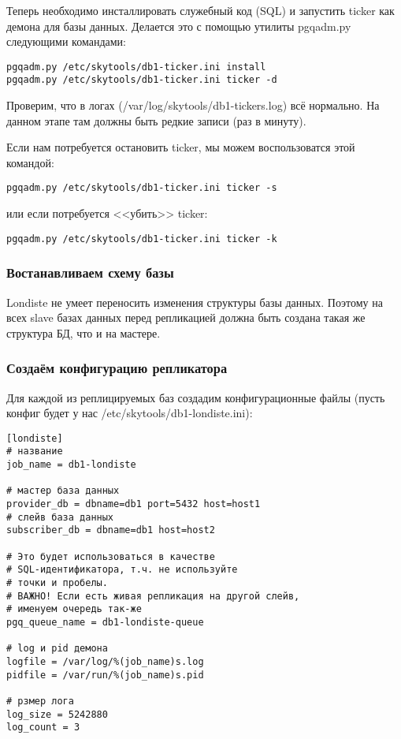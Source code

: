 Теперь необходимо инсталлировать служебный код (SQL) и запустить ticker как демона для базы данных. 
Делается это с помощью утилиты pgqadm.py следующими командами:
\begin{verbatim}
pgqadm.py /etc/skytools/db1-ticker.ini install
pgqadm.py /etc/skytools/db1-ticker.ini ticker -d
\end{verbatim}

Проверим, что в логах (/var/log/skytools/db1-tickers.log) всё нормально. На данном этапе там должны быть редкие записи (раз в минуту).

Если нам потребуется остановить ticker, мы можем воспользоватся этой командой:
\begin{verbatim}
pgqadm.py /etc/skytools/db1-ticker.ini ticker -s
\end{verbatim}
или если потребуется <<убить>> ticker:
\begin{verbatim}
pgqadm.py /etc/skytools/db1-ticker.ini ticker -k
\end{verbatim}

\subsubsection{Востанавливаем схему базы}
Londiste не умеет переносить изменения структуры базы данных. 
Поэтому на всех slave базах данных перед репликацией должна быть создана такая же структура БД, что и на мастере.

\subsubsection{Создаём конфигурацию репликатора}
Для каждой из реплицируемых баз создадим конфигурационные файлы 
(пусть конфиг будет у нас /etc/skytools/db1-londiste.ini):
\begin{verbatim}
[londiste]
# название
job_name = db1-londiste

# мастер база данных
provider_db = dbname=db1 port=5432 host=host1
# слейв база данных
subscriber_db = dbname=db1 host=host2

# Это будет использоваться в качестве 
# SQL-идентификатора, т.ч. не используйте
# точки и пробелы.
# ВАЖНО! Если есть живая репликация на другой слейв, 
# именуем очередь так-же
pgq_queue_name = db1-londiste-queue

# log и pid демона
logfile = /var/log/%(job_name)s.log
pidfile = /var/run/%(job_name)s.pid

# рзмер лога
log_size = 5242880
log_count = 3
\end{verbatim}

